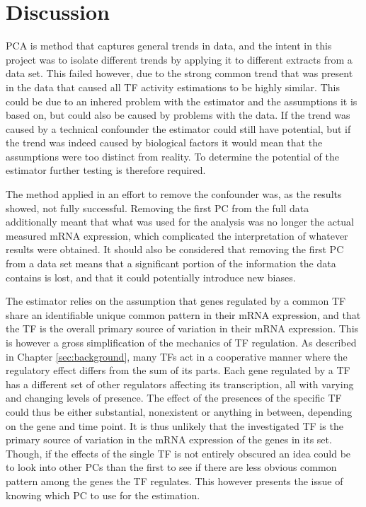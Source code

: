 \chapter{Discussion}
\vspace{-0.75cm}
\ac{PCA} is method that captures general trends in data, and the intent in this project was to isolate different trends by applying it to different extracts from a data set. This failed however, due to the strong common trend that was present in the data that caused all \ac{TF} activity estimations to be highly similar. This could be due to an inhered problem with the estimator and the assumptions it is based on, but could also be caused by problems with the data. If the trend was caused by a technical confounder the estimator could still have potential, but if the trend was indeed caused by biological factors it would mean that the assumptions were too distinct from reality. To determine the potential of the estimator further testing is therefore required.

The method applied in an effort to remove the confounder was, as the results showed, not fully successful. Removing the first \ac{PC} from the full data additionally meant that what was used for the analysis was no longer the actual measured mRNA expression, which complicated the interpretation of whatever results were obtained. It should also be considered that removing the first \ac{PC} from a data set means that a significant portion of the information the data contains is lost, and that it could potentially introduce new biases.

The estimator relies on the assumption that genes regulated by a common \ac{TF} share an identifiable unique common pattern in their mRNA expression, and that the \ac{TF} is the overall primary source of variation in their mRNA expression. This is however a gross simplification of the mechanics of \ac{TF} regulation. As described in Chapter \ref{sec:background}, many \acp{TF} act in a cooperative manner where the regulatory effect differs from the sum of its parts. Each gene regulated by a \ac{TF} has a different set of other regulators affecting its transcription, all with varying and changing levels of presence. The effect of the presences of the specific \ac{TF} could thus be either substantial, nonexistent or anything in between, depending on the gene and time point. It is thus unlikely that the investigated \ac{TF} is the primary source of variation in the mRNA expression of the genes in its set. Though, if the effects of the single \ac{TF} is not entirely obscured an idea could be to look into other \acp{PC} than the first to see if there are less obvious common pattern among the genes the \ac{TF} regulates. This however presents the issue of knowing which \ac{PC} to use for the estimation.

